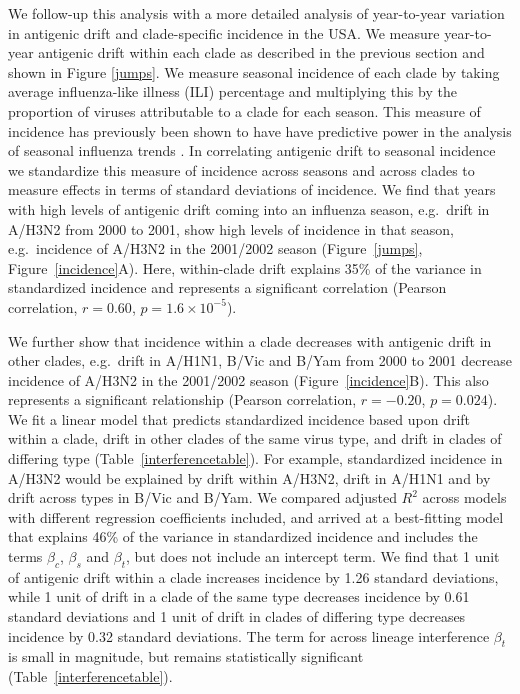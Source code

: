 \documentclass[11pt,oneside,letterpaper]{article}
\newcommand{\bwithin}{\beta_c}		%
\newcommand{\bsister}{\beta_s}		%
\newcommand{\bother}{\beta_t}			%
\begin{document}
We follow-up this analysis with a more detailed analysis of year-to-year variation in antigenic drift and clade-specific incidence in the USA.
We measure year-to-year antigenic drift within each clade as described in the previous section and shown in Figure \ref{jumps}.
We measure seasonal incidence of each clade by taking average influenza-like illness (ILI) percentage and multiplying this by the proportion of viruses attributable to a clade for each season.
This measure of incidence has previously been shown to have have predictive power in the analysis of seasonal influenza trends \cite{Goldstein11}.
In correlating antigenic drift to seasonal incidence we standardize this measure of incidence across seasons and across clades to measure effects in terms of standard deviations of incidence.
We find that years with high levels of antigenic drift coming into an influenza season, e.g.\ drift in A/H3N2 from 2000 to 2001, show high levels of incidence in that season, e.g.\ incidence of A/H3N2 in the 2001/2002 season (Figure~\ref{jumps}, Figure~\ref{incidence}A). 
Here, within-clade drift explains 35\% of the variance in standardized incidence and represents a significant correlation (Pearson correlation, $r=0.60$, $p=1.6 \times 10^{-5}$).

We further show that incidence within a clade decreases with antigenic drift in other clades, e.g.\ drift in A/H1N1, B/Vic and B/Yam from 2000 to 2001 decrease incidence of A/H3N2 in the 2001/2002 season (Figure~\ref{incidence}B).
This also represents a significant relationship (Pearson correlation, $r=-0.20$, $p=0.024$).
We fit a linear model that predicts standardized incidence based upon drift within a clade, drift in other clades of the same virus type, and drift in clades of differing type (Table~\ref{interferencetable}).
For example, standardized incidence in A/H3N2 would be explained by drift within A/H3N2, drift in A/H1N1 and by drift across types in B/Vic and B/Yam.
We compared adjusted $R^2$ across models with different regression coefficients included, and arrived at a best-fitting model that explains 46\% of the variance in standardized incidence and includes the terms $\bwithin$, $\bsister$ and $\bother$, but does not include an intercept term.
We find that 1 unit of antigenic drift within a clade increases incidence by 1.26 standard deviations, while 1 unit of drift in a clade of the same type decreases incidence by 0.61 standard deviations and 1 unit of drift in clades of differing type decreases incidence by 0.32 standard deviations.
The term for across lineage interference $\bother$ is small in magnitude, but remains statistically significant (Table~\ref{interferencetable}).
\end{document}

